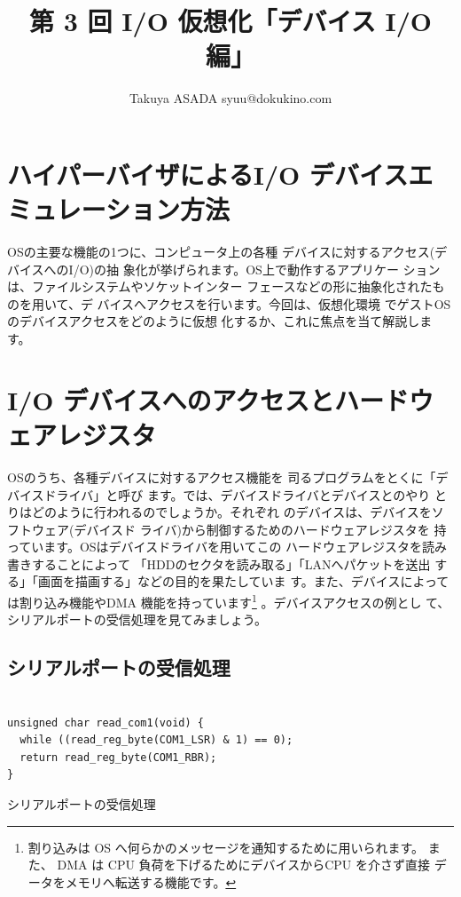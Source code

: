 
\title{第 3 回 I/O 仮想化「デバイス I/O 編」}
\author{Takuya ASADA syuu@dokukino.com}

\maketitle

\section{ハイパーバイザによるI/O デバイスエミュレーション方法}

 OSの主要な機能の1つに、コンピュータ上の各種
デバイスに対するアクセス(デバイスへのI/O)の抽
象化が挙げられます。OS上で動作するアプリケー
ションは、ファイルシステムやソケットインター
フェースなどの形に抽象化されたものを用いて、デ
バイスへアクセスを行います。今回は、仮想化環境
でゲストOSのデバイスアクセスをどのように仮想
化するか、これに焦点を当て解説します。


\section{I/O デバイスへのアクセスとハードウェアレジスタ}

 OSのうち、各種デバイスに対するアクセス機能を
司るプログラムをとくに「デバイスドライバ」と呼び
ます。では、デバイスドライバとデバイスとのやり
とりはどのように行われるのでしょうか。それぞれ
のデバイスは、デバイスをソフトウェア(デバイスド
ライバ)から制御するためのハードウェアレジスタを
持っています。OSはデバイスドライバを用いてこの
ハードウェアレジスタを読み書きすることによって
「HDDのセクタを読み取る」「LANへパケットを送出
する」「画面を描画する」などの目的を果たしていま
す。また、デバイスによっては割り込み機能やDMA
機能を持っています\footnote{
割り込みは OS へ何らかのメッセージを通知するために用いられます。
また、 DMA は CPU 負荷を下げるためにデバイスからCPU を介さず直接
データをメモリへ転送する機能です。
}
。デバイスアクセスの例とし
て、シリアルポートの受信処理を見てみましょう。

\subsection*{シリアルポートの受信処理}

\begin{program}\centering
\begin{verbatim}

unsigned char read_com1(void) {
  while ((read_reg_byte(COM1_LSR) & 1) == 0);
  return read_reg_byte(COM1_RBR);
}

\end{verbatim}
\caption{シリアルポートの受信処理}
\end{program}

